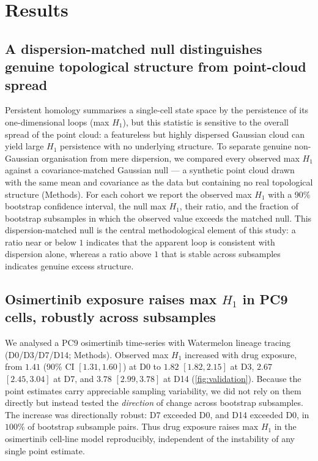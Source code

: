 \section{Results}

\subsection*{A dispersion-matched null distinguishes genuine topological
structure from point-cloud spread}

Persistent homology summarises a single-cell state space by the
persistence of its one-dimensional loops (max $H_1$), but this statistic
is sensitive to the overall spread of the point cloud: a featureless but
highly dispersed Gaussian cloud can yield large $H_1$ persistence with no
underlying structure. To separate genuine non-Gaussian organisation from
mere dispersion, we compared every observed max $H_1$ against a
covariance-matched Gaussian null --- a synthetic point cloud drawn with
the same mean and covariance as the data but containing no real
topological structure (Methods). For each cohort we report the observed
max $H_1$ with a 90\% bootstrap confidence interval, the null max $H_1$,
their ratio, and the fraction of bootstrap subsamples in which the
observed value exceeds the matched null. This dispersion-matched null is
the central methodological element of this study: a ratio near or below
$1$ indicates that the apparent loop is consistent with dispersion alone,
whereas a ratio above $1$ that is stable across subsamples indicates
genuine excess structure.

\subsection*{Osimertinib exposure raises max $H_1$ in PC9 cells, robustly
across subsamples}

We analysed a PC9 osimertinib time-series with Watermelon lineage tracing
(D0/D3/D7/D14; Methods). Observed max $H_1$ increased with drug exposure,
from $1.41$ (90\% CI $[1.31, 1.60]$) at D0 to $1.82$ $[1.82, 2.15]$ at D3,
$2.67$ $[2.45, 3.04]$ at D7, and $3.78$ $[2.99, 3.78]$ at D14
(\cref{fig:validation}). Because the point estimates carry appreciable
sampling variability, we did not rely on them directly but instead tested
the \emph{direction} of change across bootstrap subsamples. The increase
was directionally robust: D7 exceeded D0, and D14 exceeded D0, in
$100\%$ of bootstrap subsample pairs. Thus drug exposure raises max $H_1$
in the osimertinib cell-line model reproducibly, independent of the
instability of any single point estimate.

